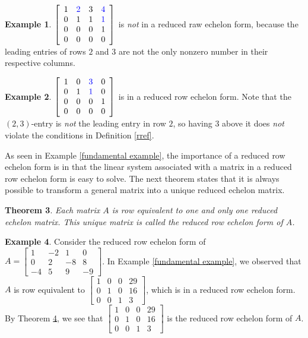 \documentclass[12pt,letterpaper]{book}
\def\blue{\textcolor{blue}}
\numberwithin{equation}{section}
\newtheorem{thm}{\textbf{Theorem}}[section]
\theoremstyle{definition}
\newtheorem{example}[thm]{\textbf{Example}}
\begin{document}
\begin{example} $\left[\begin{array}{rrrr} 1 & \blue{2} & 3 & \blue{4}
\\ 0 & 1 & 1 & \blue{1} \\ 0 & 0 & 0 & 1 \\ 0 & 0 & 0 & 0
\end{array}\right]$ is \textit{not} in a reduced raw echelon form, because the leading entries of rows $2$ and $3$ are not the only nonzero number in their respective columns.
\end{example}

\begin{example} $\left[\begin{array}{rrrr} 1 & 0 & \blue{3} & 0
\\ 0 & 1 & \blue{1} & 0 \\ 0 & 0 & 0 & 1 \\ 0 & 0 & 0 & 0
\end{array}\right]$ is in a reduced row echelon form. Note that the $(2,3)$-entry is \textit{not} the leading entry in row $2$, so having $3$ above it does \textit{not} violate the conditions in Definition \ref{rref}.
\end{example}

As seen in Example \ref{fundamental example}, the importance of a reduced row echelon form is in that the linear system associated with a matrix in a reduced row echelon form is easy to solve. The next theorem states that it is always possible to transform a general matrix into a unique reduced echelon matrix.

\begin{thm}\label{unique rref} Each matrix $A$ is row equivalent to one and only
one reduced echelon matrix. This unique matrix is called \textit{the} reduced row echelon form of $A$.
\end{thm}

\begin{example}\label{unique rref} Consider the reduced row echelon form of
$A=\left[\begin{array}{rrrr}1&-2&1&0\\0&2&-8&8
\\-4&5&9&-9\end{array}\right]$. In Example \ref{fundamental example}, we observed that $A$ is row equivalent to $\left[\begin{array}{rrrr}1&0&0&29\\0&1&0&16 \\ 0&0&1&3\end{array}\right]$, which is in a reduced row echelon form. By Theorem \ref{unique rref}, we see that $\left[\begin{array}{rrrr}1&0&0&29\\0&1&0&16 \\ 0&0&1&3\end{array}\right]$ is the reduced row echelon form of $A$.
\end{example}
\end{document}
